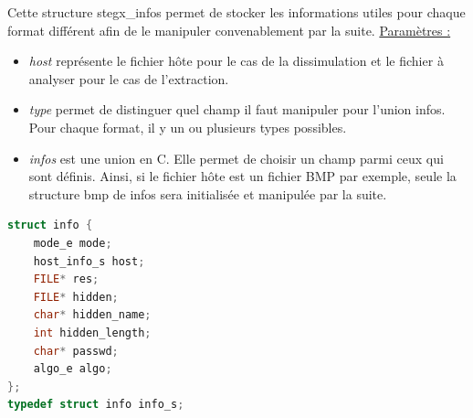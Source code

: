 \documentclass[11pt]{article}
\begin{document}
Cette structure stegx\_infos permet de stocker les informations 
utiles pour chaque format différent afin de le manipuler convenablement 
par la suite. 
\newline
\underline{Paramètres :}
\begin{itemize}
\item \textit{host} représente le fichier hôte pour le cas de la dissimulation 
et le fichier à analyser pour le cas de l'extraction. 
\item \textit{type} permet de distinguer quel champ il faut manipuler pour l'union 
infos. Pour chaque format, il y un ou plusieurs types possibles.
\item \textit{infos} est une union en C. Elle permet de choisir un champ parmi
ceux qui sont définis. Ainsi, si le fichier hôte est un fichier BMP par exemple, 
seule la structure bmp de infos sera initialisée et manipulée par la suite.
\newline
\end{itemize}

\begin{lstlisting}[language=c]
struct info {
    mode_e mode;                
    host_info_s host;           
    FILE* res;                 
    FILE* hidden;              
    char* hidden_name;
    int hidden_length; 
    char* passwd;
    algo_e algo;
};
typedef struct info info_s;
\end{lstlisting}
\end{document}
